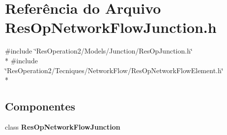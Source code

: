 \section{Referência do Arquivo Res\+Op\+Network\+Flow\+Junction.\+h}
\label{_res_op_network_flow_junction_8h}
{\ttfamily \#include \char`\"{}Res\+Operation2/\+Models/\+Junction/\+Res\+Op\+Junction.\+h\char`\"{}}\\*
{\ttfamily \#include \char`\"{}Res\+Operation2/\+Tecniques/\+Network\+Flow/\+Res\+Op\+Network\+Flow\+Element.\+h\char`\"{}}\\*
\subsection*{Componentes}
\begin{DoxyCompactItemize}
\item 
class {\bf Res\+Op\+Network\+Flow\+Junction}
\end{DoxyCompactItemize}
